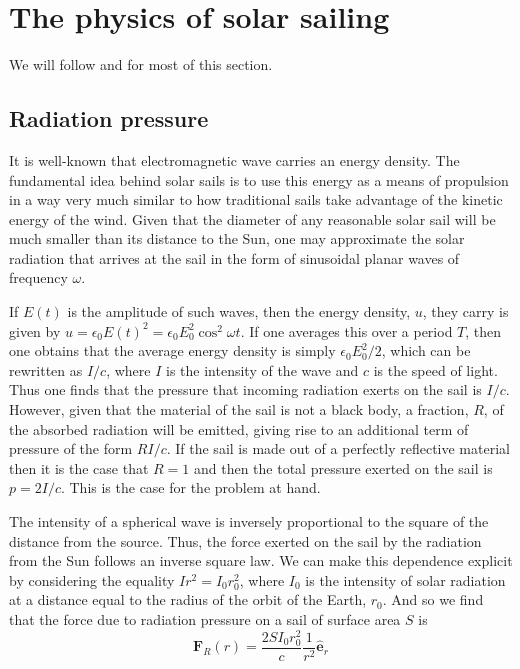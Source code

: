 \documentclass[twocolumn,12pt,a4paper]{article}
\numberwithin{equation}{section}
\begin{document}
\section{The physics of solar sailing}
We will follow \cite{tsu} and \cite{mcinnes} for most of this section.
\subsection{Radiation pressure}
It is well-known that electromagnetic wave carries an energy density. The fundamental idea behind solar sails is to use this energy as a means of propulsion in a way very much similar to how traditional sails take advantage of the kinetic energy of the wind. Given that the diameter of any reasonable solar sail will be much smaller than its distance to the Sun, one may approximate the solar radiation that arrives at the sail in the form of sinusoidal planar waves of frequency \( \omega \).

If \( E(t) \) is the amplitude of such waves, then the energy density, \( u \), they carry is given by \( u = \epsilon_0 E(t)^2 = \epsilon_0 E_0^2 \cos^2{\omega t} \). If one averages this over a period \( T \), then one obtains that the average energy density is simply \( \epsilon_0 E_0^2 /2 \), which can be rewritten as \( I/c \), where \( I \) is the intensity of the wave and \( c \) is the speed of light. Thus one finds that the pressure that incoming radiation exerts on the sail is \( I/c \). However, given that the material of the sail is not a black body, a fraction, \( R \), of the absorbed radiation will be emitted, giving rise to an additional term of pressure of the form \( RI/c \). If the sail is made out of a perfectly reflective material then it is the case that \( R = 1 \) and then the total pressure exerted on the sail is \( p = 2I/c \). This is the case for the problem at hand.

The intensity of a spherical wave is inversely proportional to the square of the distance from the source. Thus, the force exerted on the sail by the radiation from the Sun follows an inverse square law. We can make this dependence explicit by considering the equality \( Ir^2 = I_0 r^2_0 \), where \( I_0 \) is the intensity of solar radiation at a distance equal to the radius of the orbit of the Earth, \( r_0 \). And so we find that the force due to radiation pressure on a sail of surface area \( S \) is
\begin{equation}
 	\mathbf{F}_R(r) = \dfrac{2SI_0r_0^2}{c}\dfrac{1}{r^2} \mathbf{\hat{e}}_r \label{eq:radiation force}
\end{equation}
\end{document}

